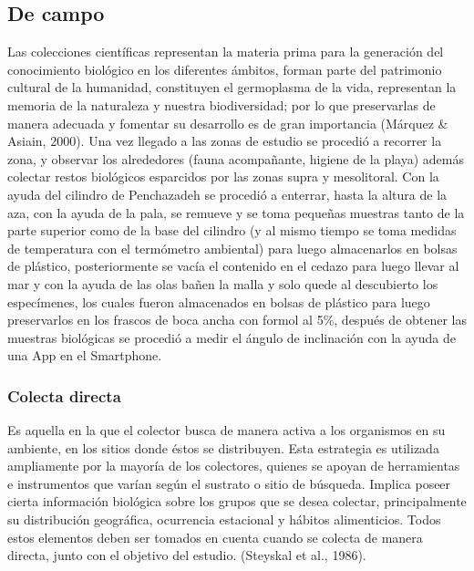 \documentclass[5p,times,authoryear]{elsarticle}
\begin{document}
\subsection{De campo}
Las colecciones cient\'ificas representan la materia prima para la generaci\'on del conocimiento biol\'ogico en los diferentes \'ambitos, forman parte del patrimonio cultural de la humanidad, constituyen el germoplasma de la vida, representan la memoria de la naturaleza y nuestra biodiversidad; por lo que preservarlas de manera adecuada y fomentar su desarrollo es de gran importancia (M\'arquez \& Asiain, 2000).
Una vez llegado a las zonas de estudio se procedi\'o a recorrer la zona, y observar los alrededores (fauna acompa\~nante, higiene de la playa) adem\'as colectar restos biol\'ogicos esparcidos por las zonas supra y mesolitoral. Con la ayuda del cilindro de Penchazadeh se procedi\'o a enterrar, hasta la altura de la aza, con la ayuda de la pala,  se remueve y se toma peque\~nas muestras tanto de la parte superior como de la base del cilindro (y al mismo tiempo se toma medidas de temperatura con el term\'ometro ambiental) para luego almacenarlos en bolsas de pl\'astico, posteriormente se  vac\'ia el contenido en el cedazo para luego llevar al mar y con la ayuda de las olas ba\~nen la malla y solo quede al descubierto los espec\'imenes, los cuales fueron almacenados en bolsas de pl\'astico para luego preservarlos en los frascos de boca ancha con formol al 5\%, despu\'es de obtener las muestras biol\'ogicas se procedi\'o a medir el \'angulo de inclinaci\'on con la ayuda de una App en el Smartphone.

\subsubsection{Colecta directa}
Es aquella en la que el colector busca de manera activa a los organismos en su ambiente, en los sitios donde \'estos se distribuyen. Esta estrategia es utilizada ampliamente por la mayor\'ia de los colectores, quienes se apoyan de herramientas e instrumentos que var\'ian seg\'un el sustrato o sitio de b\'usqueda. Implica poseer cierta informaci\'on biol\'ogica sobre los grupos que se desea colectar, principalmente su distribuci\'on geogr\'afica, ocurrencia estacional y h\'abitos alimenticios. Todos estos elementos deben ser tomados en cuenta cuando se colecta de manera directa, junto con el objetivo del estudio. (Steyskal et al., 1986).
\end{document}
